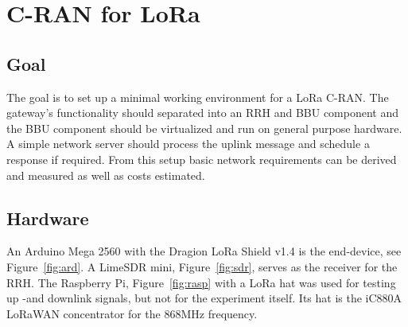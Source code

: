 \chapter{C-RAN for LoRa}
\label{chap:cran_for_lora}

\section{Goal}
The goal is to set up a minimal working environment for a LoRa C-RAN.
The gateway's functionality should separated into an RRH and BBU component and the 
BBU component should be virtualized and run on general purpose hardware. 
A simple network server should process the uplink message and schedule a response if required. From this setup 
basic network requirements can be derived and measured as well as costs estimated.

\section{Hardware}
An Arduino Mega 2560 with the Dragion LoRa Shield v1.4 is the end-device, see Figure~\ref{fig:ard}.
A LimeSDR mini, Figure~\ref{fig:sdr}, serves as the receiver for the RRH.
The Raspberry Pi, Figure~\ref{fig:rasp} with a LoRa hat was used for testing up -and downlink signals, but not for the experiment itself. 
Its hat is the iC880A LoRaWAN concentrator for the 868MHz frequency.

